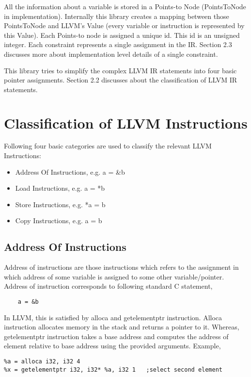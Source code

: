 \documentclass[a4paper,12pt]{report}
\begin{document}
All the information about a variable is stored in a Points-to Node 
(PointsToNode in implementation). Internally this library creates a mapping 
between those PointsToNode and LLVM's Value (every variable or instruction is 
represented by this Value). Each Points-to node is assigned a unique id. This 
id is an unsigned integer. Each constraint represents a single assignment in 
the IR. Section 2.3 discusses more about implementation level details 
of a single constraint.

This library tries to simplify the complex LLVM IR statements into four basic 
pointer assignments. Section 2.2 discusses about the classification of LLVM IR 
statements.

\section{Classification of LLVM Instructions}
Following four basic categories are used to classify the relevant LLVM 
Instructions:

\begin{itemize}
    \item Address Of Instructions, e.g. a = \&b
    \item Load Instructions, e.g.  a = *b
    \item Store Instructions, e.g. *a = b
    \item Copy Instructions, e.g. a = b
\end{itemize}

\subsection{Address Of Instructions}
Address of instructions are those instructions which refers to the assignment 
in which address of some variable is assigned to some other variable/pointer.
Address of instruction corresponds to following standard C statement,
    
\begin{lstlisting}
    a = &b
\end{lstlisting}

In LLVM, this is satisfied by alloca and getelementptr instruction.
Alloca instruction allocates memory in the stack and returns a pointer to it.
Whereas, getelementptr instruction takes a base address and computes the address
of element relative to base address using the provided arguments.
Example,

\begin{verbatim}
%a = alloca i32, i32 4
%x = getelementptr i32, i32* %a, i32 1   ;select second element                 
 
                       
\end{verbatim}
\end{document}
